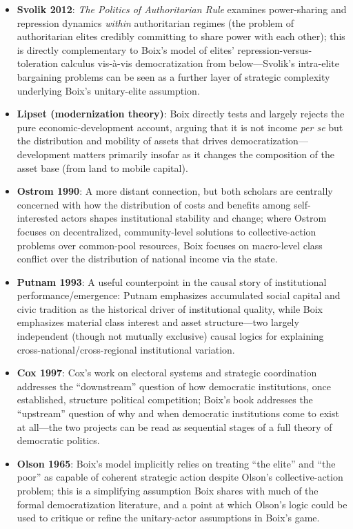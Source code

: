 \documentclass[12pt]{article}
\begin{document}
\begin{itemize}[leftmargin=*, itemsep=4pt]
    \item \textbf{Svolik 2012}: \textit{The Politics of Authoritarian Rule} examines power-sharing and repression dynamics \emph{within} authoritarian regimes (the problem of authoritarian elites credibly committing to share power with each other); this is directly complementary to Boix's model of elites' repression-versus-toleration calculus vis-\`a-vis democratization from below---Svolik's intra-elite bargaining problems can be seen as a further layer of strategic complexity underlying Boix's unitary-elite assumption.
    \item \textbf{Lipset (modernization theory)}: Boix directly tests and largely rejects the pure economic-development account, arguing that it is not income \emph{per se} but the distribution and mobility of assets that drives democratization---development matters primarily insofar as it changes the composition of the asset base (from land to mobile capital).
    \item \textbf{Ostrom 1990}: A more distant connection, but both scholars are centrally concerned with how the distribution of costs and benefits among self-interested actors shapes institutional stability and change; where Ostrom focuses on decentralized, community-level solutions to collective-action problems over common-pool resources, Boix focuses on macro-level class conflict over the distribution of national income via the state.
    \item \textbf{Putnam 1993}: A useful counterpoint in the causal story of institutional performance/emergence: Putnam emphasizes accumulated social capital and civic tradition as the historical driver of institutional quality, while Boix emphasizes material class interest and asset structure---two largely independent (though not mutually exclusive) causal logics for explaining cross-national/cross-regional institutional variation.
    \item \textbf{Cox 1997}: Cox's work on electoral systems and strategic coordination addresses the ``downstream'' question of how democratic institutions, once established, structure political competition; Boix's book addresses the ``upstream'' question of why and when democratic institutions come to exist at all---the two projects can be read as sequential stages of a full theory of democratic politics.
    \item \textbf{Olson 1965}: Boix's model implicitly relies on treating ``the elite'' and ``the poor'' as capable of coherent strategic action despite Olson's collective-action problem; this is a simplifying assumption Boix shares with much of the formal democratization literature, and a point at which Olson's logic could be used to critique or refine the unitary-actor assumptions in Boix's game.
\end{itemize}
\end{document}
